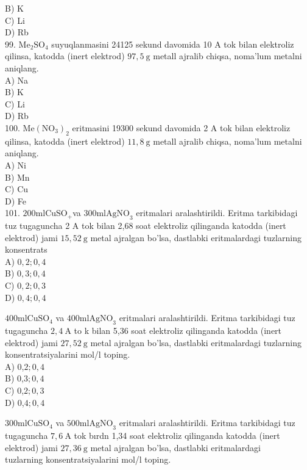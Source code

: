 B) K\\
C) Li\\
D) Rb\\
99. $\mathrm{Me}_{2} \mathrm{SO}_{4}$ suyuqlanmasini 24125 sekund davomida 10 A tok bilan elektroliz qilinsa, katodda (inert elektrod) $97,5 \mathrm{~g}$ metall ajralib chiqsa, noma'lum metalni aniqlang.\\
A) Na\\
B) K\\
C) Li\\
D) Rb\\
100. $\mathrm{Me}\left(\mathrm{NO}_{3}\right)_{2}$ eritmasini 19300 sekund davomida 2 A tok bilan elektroliz qilinsa, katodda (inert elektrod) $11,8 \mathrm{~g}$ metall ajralib chiqsa, noma'lum metalni aniqlang.\\
A) Ni\\
B) Mn\\
C) Cu\\
D) Fe\\
101. $200 \mathrm{ml} \mathrm{CuSO}_{+}$va $300 \mathrm{ml} \mathrm{AgNO}_{3}$ eritmalari aralashtirildi. Eritma tarkibidagi tuz tugaguncha 2 A tok bilan 2,68 soat elektroliz qilinganda katodda (inert elektrod) jami $15,52 \mathrm{~g}$ metal ajralgan bo'lsa, dastlabki eritmalardagi tuzlarning konsentrats\\
A) $0,2 ; 0,4$\\
B) $0,3 ; 0,4$\\
C) $0,2 ; 0,3$\\
D) $0,4 ; 0,4$
  \item $400 \mathrm{ml} \mathrm{CuSO}_{4}$ va $400 \mathrm{ml} \mathrm{AgNO}_{3}$ eritmalari aralashtirildi. Eritma tarkibidagi tuz tugaguncha $2,4 \mathrm{~A}$ to k bilan 5,36 soat elektroliz qilinganda katodda (inert elektrod) jami $27,52 \mathrm{~g}$ metal ajralgan bo'lsa, dastlabki eritmalardagi tuzlarning konsentratsiyalarini mol/l toping.\\
A) 0,$2 ; 0,4$\\
B) 0,$3 ; 0,4$\\
C) 0,$2 ; 0,3$\\
D) 0,$4 ; 0,4$
  \item $300 \mathrm{ml} \mathrm{CuSO}_{4}$ va $500 \mathrm{ml} \mathrm{AgNO}_{3}$ eritmalari aralashtirildi. Eritma tarkibidagi tuz tugaguncha $7,6 \mathrm{~A}$ tok bırdn 1,34 soat elektroliz qilinganda katodda (inert elektrod) jami $27,36 \mathrm{~g}$ metal ajralgan bo'lsa, dastlabki eritmalardagi\\
tuzlarning konsentratsiyalarini mol/l toping.\\

